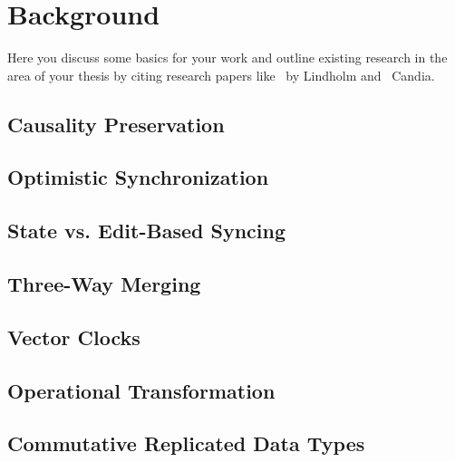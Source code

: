 
\chapter{Background}\label{background}

Here you discuss some basics for your work and outline existing research in the area of your thesis by citing research papers like~\cite{Lindholm:2009wo} by Lindholm and~\cite{DeCandia:2007ui,Ratner:2001wz} Candia.

\section{Causality Preservation}
\section{Optimistic Synchronization}
\section{State vs. Edit-Based Syncing}
\section{Three-Way Merging}
\section{Vector Clocks}
\section{Operational Transformation}
\section{Commutative Replicated Data Types}